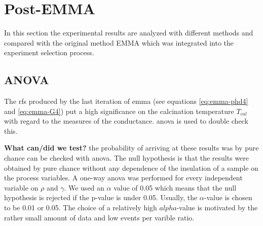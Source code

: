 \section{Post-EMMA}
\label{sec:res-post-emma}
In this section the experimental results are analyzed with different methods and compared with the original method EMMA which was integrated into the experiment selection process. 
\subsection{ANOVA}\label{sec:res-anova}
The \gls{rf}s produced by the last iteration of \gls{emma} (see equations \ref{eq:emma-phd4} and \ref{eq:emma-G4}) put a high significance
on the calcination temperature $T_{cal}$ with regard to the 
measures of the conductance. 
\Gls{anova} is used to double check this. 

\textbf{What can/did we test?}
the probability of arriving at these results was by pure chance can be checked with \gls{anova}. 
The null hypothesis is that the results were obtained by pure chance without any dependence of the insulation of a sample on the process variables.
A one-way \gls{anova} was performed for every independent variable on $\rho$ and $\gamma$. 
We used an $\alpha$ value of 0.05 which means that 
the null hypothesis is rejected if the p-value is under 0.05. 
Usually, the $\alpha$-value is chosen to be 0.01 or 0.05\cite{hoffman2020concept,sellke2001pvalues}.
The choice of a relatively high $alpha$-value is motivated by the rather small amount of data and low events per varible ratio.

